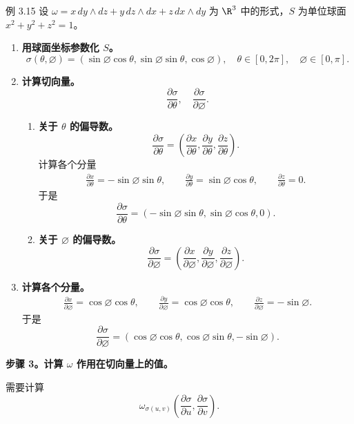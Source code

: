 \begin{statement}{例 3.15}{}
设 $\omega=x\,dy\wedge dz+y\,dz\wedge dx+z\,dx\wedge dy$ 为 $\R^3$ 中的形式，$S$ 为单位球面 $x^2+y^2+z^2=1$。
\begin{enumerate}
\item \textbf{用球面坐标参数化 $S$。}
\[
  \sigma(\theta,\varnothing)
  =(\sin\varnothing\cos\theta,\sin\varnothing\sin\theta,\cos\varnothing),
  \quad\theta\in[0,2\pi],\quad\varnothing\in[0,\pi].
\]
\item \textbf{计算切向量。}
\[
  \frac{\partial\sigma}{\partial\theta},\quad
  \frac{\partial\sigma}{\partial\varnothing}.
\]
\begin{enumerate}[label=\alph*.]
\item \textbf{关于 $\theta$ 的偏导数。}
\[
  \frac{\partial\sigma}{\partial\theta}
    =\left(\frac{\partial x}{\partial\theta},\frac{\partial y}{\partial\theta},
      \frac{\partial z}{\partial\theta}\right).
\]
计算各个分量
\begin{gather*}
  \frac{\partial x}{\partial\theta}=-\sin\varnothing\sin\theta,\qquad
  \frac{\partial y}{\partial\theta}=\sin\varnothing\cos\theta,\qquad
  \frac{\partial z}{\partial\theta}=0.
\end{gather*}
于是
\[
  \frac{\partial\sigma}{\partial\theta}
    =(-\sin\varnothing\sin\theta,\sin\varnothing\cos\theta,0).
\]
\item \textbf{关于 $\varnothing$ 的偏导数。}
\[
  \frac{\partial\sigma}{\partial\varnothing}
    =\left(\frac{\partial x}{\partial\varnothing},\frac{\partial y}{\partial\varnothing},
      \frac{\partial z}{\partial\varnothing}\right).
\]
\end{enumerate}
\item \textbf{计算各个分量。}%
%
\begin{gather*}
  \frac{\partial x}{\partial\varnothing}=\cos\varnothing\cos\theta,\qquad
  \frac{\partial y}{\partial\varnothing}=\cos\varnothing\cos\theta,\qquad
  \frac{\partial z}{\partial\varnothing}=-\sin\varnothing.
\end{gather*}
于是
\[
  \frac{\partial\sigma}{\partial\varnothing}
    =(\cos\varnothing\cos\theta,\cos\varnothing\sin\theta,-\sin\varnothing).
\]
\end{enumerate}

\noindent\textbf{步骤 3。计算 $\omega$ 作用在切向量上的值。}\par
需要计算
\[
  \omega_{\sigma(u,v)}\left(\frac{\partial\sigma}{\partial u},\frac{\partial\sigma}{\partial v}\right).
\]


\end{statement}
